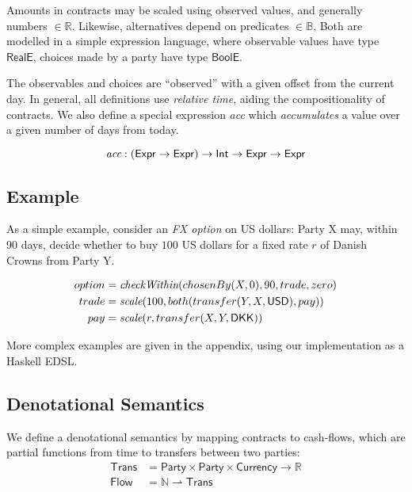 \documentclass[a4paper,debug,twocolumn]{easychair}
\newcommand{\comm}[3][red]{{\small \color{#1}{$\spadesuit$#2: #3}}}
\newcommand{\jbcomment}[1]{\comm[orange]{jb}{#1}}
\newcommand\type[1]{\mathsf{#1}}
\newcommand\reals{{\mathbb R}}
\newcommand\nats{{\mathbb N}}
\newcommand\pto{\rightharpoonup}
\theoremstyle{plain}
\begin{document}
Amounts in contracts may be scaled using observed values, and generally
numbers $\in \mathbb{R}$. Likewise, alternatives depend on predicates
$\in \mathbb{B}$. Both are modelled in a simple expression language,
where 
observable values have type $\type{RealE}$, choices made by a party
have type $\type{BoolE}$.\jbcomment{is that so?}

The observables and choices are ``observed'' with a given offset from the
current day. In general, all definitions use \emph{relative time}, aiding
the compositionality of contracts.
We also define a special expression \emph{acc} which \emph{accumulates} a
value over a given number of days from today.

\vspace*{-2ex}
{\footnotesize
\[
\emph{acc} : (\type{Expr} \to \type{Expr}) \to \type{Int} \to \type{Expr} \to \type{Expr}
\]
}
\vspace*{-3ex}

\subsection{Example}
\label{sec:example}

As a simple example, consider an \emph{FX option} on US dollars:
Party X may, within 90 days, decide whether to buy $100$ US dollars for
a fixed rate $r$ of Danish Crowns from Party Y.

\vspace*{-2ex}
{\footnotesize
\begin{align*}
option &= \emph{checkWithin}(chosenBy(X,0), 90, trade, zero)\\
trade &= \emph{scale}(100, both(transfer(Y, X,\type{USD}), pay))\\
pay &= \emph{scale}(r, transfer(X, Y,\type{DKK}))
\end{align*}

}

More complex examples are given in the appendix, using our implementation as a
Haskell EDSL.

\subsection{Denotational Semantics}
\label{sec:semantics}

We define a denotational semantics by mapping contracts to cash-flows,
which are partial functions from time to transfers between two
parties:
\begin{align*}
  \type{Trans} &= \type{Party} \times \type{Party} \times
  \type{Currency} \to \reals\\
  \type{Flow} &= \nats \pto \type{Trans}
\end{align*}
\end{document}
